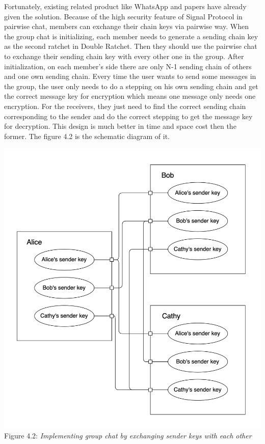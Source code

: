 \begin{enumerate}[label=(\roman*)]
Fortunately, existing related product like WhatsApp \citep{GroupChat1} and papers \citep{GroupChat} have already given the solution. Because of the high security feature of Signal Protocol in pairwise chat, members can exchange their chain keys via pairwise way. When the group chat is initializing, each member needs to generate a sending chain key as the second ratchet in Double Ratchet. Then they should use the pairwise chat to exchange their sending chain key with every other one in the group. After initialization, on each member's side there are only N-1 sending chain of others and one own sending chain. Every time the user wants to send some messages in the group, the user only needs to do a stepping on his own sending chain and get the correct message key for encryption which means one message only needs one encryption. For the receivers, they just need to find the correct sending chain corresponding to the sender and do the correct stepping to get the message key for decryption. This design is much better in time and space cost then the former. The figure 4.2 is the schematic diagram of it.

\begin{center}
\includegraphics[scale=.5]{../4-Implementation/resources/Figure4-2.png}\\
Figure 4.2: \textit{Implementing group chat by exchanging sender keys with each other}
\end{center}


\end{enumerate}
